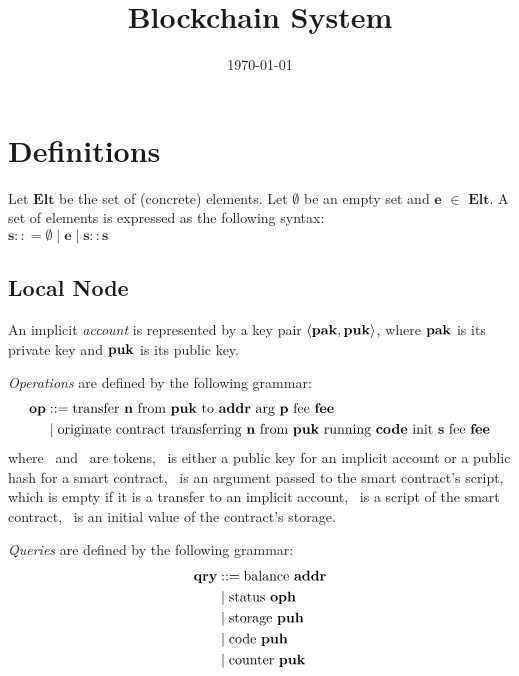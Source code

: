 \documentclass[a4paper]{llncs}
\title{Blockchain System}
\author{}
\institute{}
\date{\today}
\begin{document}
\maketitle
\pagestyle{plain}

\section{Definitions}
\begin{definition}%
Let $\mathbf{Elt}$ be the set of (concrete) elements. Let $\emptyset$ be an empty set and $\mathbf{e}$ $\in$  $\mathbf{Elt}$. A set of elements is expressed as the following syntax:
\\
$\mathbf{s} :: = \emptyset \mid \mathbf{e} \mid \mathbf{s :: s}$
\end{definition}

\subsection{Local Node}
\label{sec:local-node}


\begin{definition}%
  An implicit \emph{account} is represented by a key pair $\langle
  \PAK, \PUK
  \rangle $, where
  $\PAK$ is its private key and $\PUK$ is its public key.
\end{definition}


\begin{definition}%
  \emph{Operations} are defined by the following grammar:
  \begin{align*}
    \OP &::= \TRANSFER[\PARAMETER]\NTEZ\PUK\ADDR\MTEZ
    \\&\mid \ORIGINATE\NTEZ\PUK\CODE\INIT\MTEZ
  \end{align*}
  where \NTEZ\ and \MTEZ\ are tokens, \ADDR\ is either a public
  key for an implicit account  or a public hash for a smart contract,
  \PARAMETER\ is an argument passed to the smart contract's script,
  which is empty if it is a transfer to an implicit account, \CODE\ is
  a script of the smart contract, \INIT\ is an initial value of the
  contract's storage. 
\end{definition}

\begin{definition}%
\emph{Queries} are defined by the following grammar:
\begin{align*}
  \QRY & ::= \GETBALANCE\ADDR
  \\&\mid \GETSTATUS\OPH
  \\&\mid \GETSTORAGE\PUH
  \\&\mid \GETCODE\PUH 
  \\&\mid \GETCOUNTER\PUK
\end{align*}
\end{definition}
\end{document}
